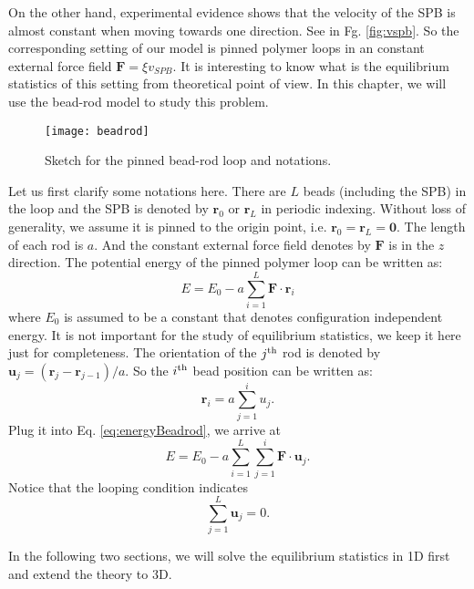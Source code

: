 On the other hand, experimental evidence shows that the velocity of the SPB is almost constant when moving towards one direction. See in Fg. \ref{fig:vspb}. So the corresponding setting of our model is pinned polymer loops in an constant external force field $\mathbf{F}=\xi v_{SPB}$. It is interesting to know what is the equilibrium statistics of this setting from theoretical point of view. In this chapter, we will use the bead-rod model to study this problem. 
\begin{figure}[htpb]
    \centering
    \texttt{[image: beadrod]}
    \caption{Sketch for the pinned bead-rod loop and notations. }
    \label{fig:beadrod}
\end{figure}

Let us first clarify some notations here. There are $L$ beads (including the SPB) in the loop and the SPB is denoted by $\mathbf{r}_0$ or $\mathbf{r}_L$ in periodic indexing. Without loss of generality, we assume it is pinned to the origin point, i.e. $\mathbf{r}_0 = \mathbf{r}_L = \mathbf{0}$. The length of each rod is $a$. And the constant external force field denotes by $\mathbf{F}$ is in the $z$ direction. The potential energy of the pinned polymer loop can be written as:
\begin{equation}
    \label{eq:energyBeadrod}
    E = E_0 - a\sum_{i=1}^{L} \mathbf{F}\cdot\mathbf{r}_i
\end{equation}
where $E_0$ is assumed to be a constant that denotes configuration independent energy. It is not important for the study of equilibrium statistics, we keep it here just for completeness. The orientation of the $j^{\rm{th}}$ rod is denoted by $\mathbf{u}_j = (\mathbf{r}_{j}-\mathbf{r}_{j-1})/a$. So the $i^{\rm{th}}$ bead position can be written as:
\begin{equation}
    \label{eq:beadposRodsum}
    \mathbf{r}_i = a \sum_{j=1}^{i} {u}_j.
\end{equation}
Plug it into Eq. \eqref{eq:energyBeadrod}, we arrive at
\begin{equation}
    \label{eq:energyRodsum}
    E = E_0-a\sum_{i=1}^{L}\sum_{j=1}^{i}\mathbf{F}\cdot\mathbf{u}_j.
\end{equation}
Notice that the looping condition indicates
\begin{equation}
    \label{eq:loopCondition}
    \sum_{j=1}^{L} \mathbf{u}_j = 0.
\end{equation}

In the following two sections, we will solve the equilibrium statistics in 1D first and extend the theory to 3D.


